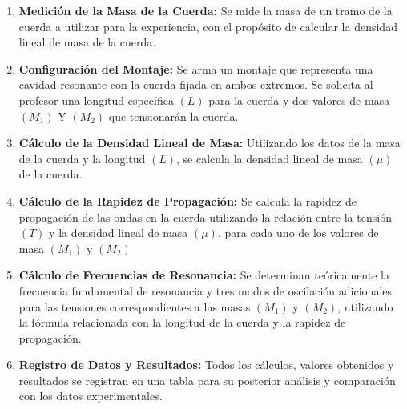 \documentclass[twocolumn, 12pt]{article}
\begin{document}
\begin{enumerate}
    \item \textbf{Medición de la Masa de la Cuerda:} Se mide la masa de un
          tramo de la cuerda a utilizar para la experiencia, con el
          propósito de calcular la densidad lineal de masa de la
          cuerda.

    \item \textbf{Configuración del Montaje:} Se arma un montaje que
          representa una cavidad resonante con la cuerda fijada en
          ambos extremos. Se solicita al profesor una longitud
          específica $(L)$ para la cuerda y dos valores de masa
          $(M_1)$ Y $(M_2)$ que tensionarán la cuerda.

    \item \textbf{Cálculo de la Densidad Lineal de Masa:} Utilizando los datos
          de la masa de la cuerda y la longitud
          $(L)$, se calcula la densidad lineal de masa $(\mu)$ de la cuerda.

    \item \textbf{Cálculo de la Rapidez de Propagación:} Se calcula la rapidez
          de propagación de las ondas en la cuerda utilizando la relación entre la tensión $(T)$ y
          la densidad lineal de masa $(\mu)$, para cada uno de los valores de
          masa $(M_1)$ y $(M_2)$

    \item \textbf{Cálculo de Frecuencias de Resonancia:} Se determinan
          teóricamente la frecuencia fundamental de resonancia y tres
          modos de oscilación adicionales para las tensiones
          correspondientes a las masas $(M_1)$ y $(M_2)$, utilizando
          la fórmula relacionada con la longitud de la cuerda y la
          rapidez de propagación.

    \item \textbf{Registro de Datos y Resultados:} Todos los cálculos, valores
          obtenidos y resultados se registran en una tabla para su
          posterior análisis y comparación con los datos
          experimentales.
\end{enumerate}

\printbibliography
\end{document}
